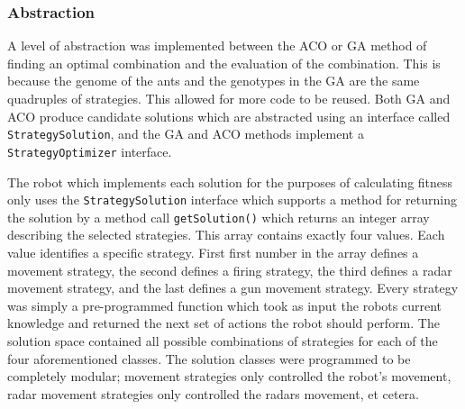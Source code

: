 

\subsubsection{Abstraction}
A level of abstraction was implemented between the ACO or GA method of finding an optimal combination and the evaluation of the combination. This is because the genome of the ants and the genotypes in the GA are the same quadruples of strategies. This allowed for more code to be reused. Both GA and ACO produce candidate solutions which are abstracted using an interface called \texttt{StrategySolution}, and the GA and ACO methods implement a \texttt{StrategyOptimizer} interface.

The robot which implements each solution for the purposes of calculating fitness only uses the \texttt{StrategySolution} interface which supports a method for returning the solution by a method call \texttt{getSolution()} which returns an integer array describing the selected strategies. This array contains exactly four values. Each value identifies a specific strategy. First first number in the array defines a movement strategy, the second defines a firing strategy, the third defines a radar movement strategy, and the last defines a gun movement strategy. Every strategy was simply a pre-programmed function which took as input the robots current knowledge and returned the next set of actions the robot should perform. The solution space contained all possible combinations of strategies for each of the four aforementioned classes. The solution classes were programmed to be completely modular; movement strategies only controlled the robot's movement, radar movement strategies only controlled the radars movement, et cetera.
